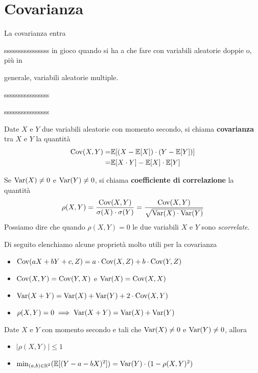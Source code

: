 \section{Covarianza}
La covarianza entra

ssssssssssssssss in gioco quando si ha a che fare con variabili aleatorie doppie o, più in

generale, variabili aleatorie multiple.

ssssssssssssssss

ssssssssssssssss

\begin{definition}
	Date $X$ e $Y$ due variabili aleatorie con momento secondo, si chiama \textbf{covarianza} tra
	$X$ e $Y$ la quantità
	\begin{align*}
		\operatorname{Cov}(X, Y) = & \mathbb{E}[(X - \mathbb{E}[X]) \cdot (Y - \mathbb{E}[Y])] \\
		=            & \mathbb{E}[X \cdot Y] - \mathbb{E}[X] \cdot \mathbb{E}[Y]
	\end{align*}
\end{definition}

\begin{definition}
	Se $\operatorname{Var}(X) \neq 0$ e $\operatorname{Var}(Y) \neq 0$, si chiama \textbf{coefficiente di correlazione} la
	quantità
	\[
		\rho(X,Y) = \frac{\operatorname{Cov}(X, Y)}{\sigma(X) \cdot \sigma(Y)}
		= \frac{\operatorname{Cov}(X, Y)}{\sqrt{\operatorname{Var}(X) \cdot \operatorname{Var}(Y)}}
	\]
	Possiamo dire che quando $\rho(X,Y) = 0$ le due variabili $X$ e $Y$ sono \emph{scorrelate}.
\end{definition}

Di seguito elenchiamo alcune proprietà molto utili per la covarianza
\begin{itemize}
	\item $\operatorname{Cov}(aX + bY + c, Z) = a \cdot \operatorname{Cov}(X, Z) + b \cdot \operatorname{Cov}(Y, Z)$
	\item $\operatorname{Cov}(X,Y) = \operatorname{Cov}(Y,X)$ e $\operatorname{Var}(X) = \operatorname{Cov}(X, X)$
	\item $\operatorname{Var}(X+Y) = \operatorname{Var}(X) + \operatorname{Var}(Y) + 2 \cdot \operatorname{Cov}(X, Y)$
	\item $\rho(X,Y) = 0 \implies \operatorname{Var}(X + Y) = \operatorname{Var}(X) + \operatorname{Var}(Y)$
\end{itemize}

\begin{proposition}
	Date $X$ e $Y$ con momento secondo e tali che $\operatorname{Var}(X) \neq 0$ e $\operatorname{Var}(Y) \neq 0$, allora
	\begin{itemize}
		\item $|\rho(X,Y)| \leq 1$
		\item $\min_{(a,b) \in \mathbb{R}^2} (\mathbb{E}[(Y - a - bX)^2]) = \operatorname{Var}(Y) \cdot (1 - \rho(X,Y)^2)$
	\end{itemize}
\end{proposition}

